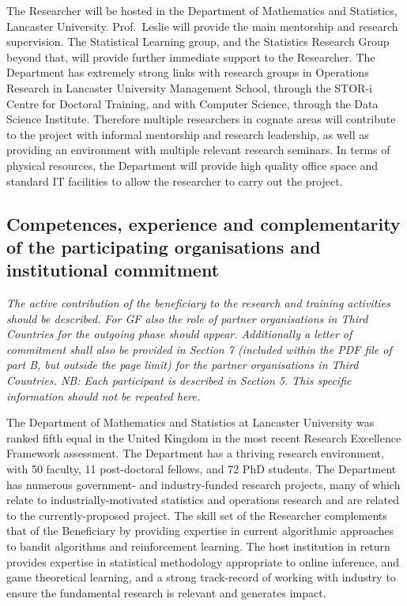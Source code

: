 \documentclass[a4paper,11pt]{article}
\begin{document}
The Researcher will be hosted in the Department of Mathematics and Statistics, Lancaster University.  Prof.\ Leslie will provide the main mentorship and research supervision.  The Statistical Learning group, and the Statistics Research Group beyond that, will provide further immediate support to the Researcher.  The Department has extremely strong links with research groups in Operations Research in Lancaster University Management School, through the STOR-i Centre for Doctoral Training, and with Computer Science, through the Data Science Institute.  Therefore multiple researchers in cognate areas will contribute to the project with informal mentorship and research leadership, as well as providing an environment with multiple relevant research seminars.  In terms of physical resources, the Department will provide high quality office space and standard IT facilities to allow the researcher to carry out the project.

\subsection{Competences, experience and complementarity of the participating organisations and institutional commitment}
\label{sec:competences}


{\em
The active contribution of the beneficiary to the research and training activities should be described. For GF also the role of partner organisations in Third Countries for the outgoing phase should appear. Additionally a letter of commitment shall also be provided in Section 7 (included within the PDF file of part B, but outside the page limit) for the partner organisations in Third Countries.
NB: Each participant is described in Section 5. This specific information should not be repeated here.
}

The Department of Mathematics and Statistics at Lancaster University was ranked fifth equal in the United Kingdom in the most recent Research Excellence Framework assessment.  The Department has a thriving research environment, with 50 faculty, 11 post-doctoral fellows, and 72 PhD students.  The Department has numerous government- and industry-funded research projects, many of which relate to industrially-motivated statistics and operations research and are related to the currently-proposed project.  The skill set of the Researcher complements that of the Beneficiary by providing expertise in current algorithmic approaches to bandit algorithms and reinforcement learning.  The host institution in return provides expertise in statistical methodology appropriate to online inference, and game theoretical learning, and a strong track-record of working with industry to ensure the fundamental research is relevant and generates impact.
\end{document}
